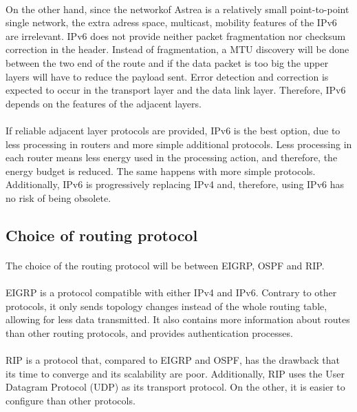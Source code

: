 \documentclass[12pt,a4paper]{report}
\begin{document}
\paragraph{}On the other hand, since the networkof Astrea is a relatively small point-to-point single network, the extra adress space, multicast, mobility features of the IPv6 are irrelevant. IPv6 does not provide neither packet fragmentation nor checksum correction in the header. Instead of fragmentation, a MTU discovery will be done between the two end of the route and if the data packet is too big the upper layers will have to reduce the payload sent. Error detection and correction is expected to occur in the transport layer and the data link layer. Therefore, IPv6 depends on the features of the adjacent layers.
\paragraph{}If reliable adjacent layer protocols are provided, IPv6 is the best option, due to less processing in routers and more simple additional protocols. Less processing in each router means less energy used in the processing action, and therefore, the energy budget is reduced. The same happens with more simple protocols. Additionally, IPv6 is progressively replacing IPv4 and, therefore, using IPv6 has no risk of being obsolete.

\subsection{Choice of routing protocol}
\paragraph{}The choice of the routing protocol will be between EIGRP, OSPF and RIP.
\paragraph{}EIGRP is a protocol compatible with either IPv4 and IPv6. Contrary to other protocols, it only sends topology changes instead of the whole routing table, allowing for less data transmitted. It also contains more information about routes than other routing protocols, and provides authentication processes.
\paragraph{}RIP is a protocol that, compared to EIGRP and OSPF, has the drawback that its time to converge and its scalability are poor. Additionally, RIP uses the User Datagram Protocol (UDP) as its transport protocol. On the other, it is easier to configure than other protocols.
\end{document}
